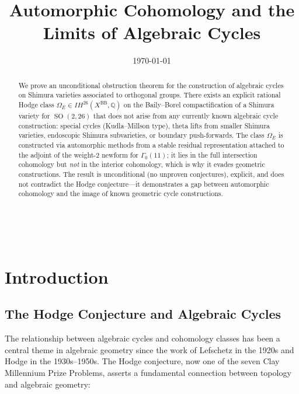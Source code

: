 \documentclass[12pt]{amsart}
\title{Automorphic Cohomology and the Limits of Algebraic Cycles}
\date{{\today}}
\theoremstyle{definition}
\DeclareMathOperator\SO{SO}
\newcommand{\Q}{\mathbb{Q}}
\newcommand{\IH}{\mathit{IH}}
\begin{document}
\maketitle

 \begin{center}
 \\
 \vspace{10px}
\end{center}

\begin{abstract}
We prove an unconditional obstruction theorem for the construction of algebraic cycles on Shimura varieties associated to orthogonal groups. There exists an explicit rational Hodge class $\Omega_E \in \IH^{26}(X^{\mathrm{BB}}, \Q)$ on the Baily--Borel compactification of a Shimura variety for $\SO(2, 26)$ that does not arise from any currently known algebraic cycle construction: special cycles (Kudla--Millson type), theta lifts from smaller Shimura varieties, endoscopic Shimura subvarieties, or boundary push-forwards. The class $\Omega_E$ is constructed via automorphic methods from a stable residual representation attached to the adjoint of the weight-$2$ newform for $\Gamma_0(11)$; it lies in the full intersection cohomology but \emph{not} in the interior cohomology, which is why it evades geometric constructions. The result is unconditional (no unproven conjectures), explicit, and does not contradict the Hodge conjecture---it demonstrates a gap between automorphic cohomology and the image of known geometric cycle constructions.
\end{abstract}

\tableofcontents

\section{Introduction}




\subsection{The Hodge Conjecture and Algebraic Cycles}

The relationship between algebraic cycles and cohomology classes has been a central theme in algebraic geometry since the work of Lefschetz in the 1920s and Hodge in the 1930s--1950s. The Hodge conjecture, now one of the seven Clay Millennium Prize Problems, asserts a fundamental connection between topology and algebraic geometry:
\end{document}
